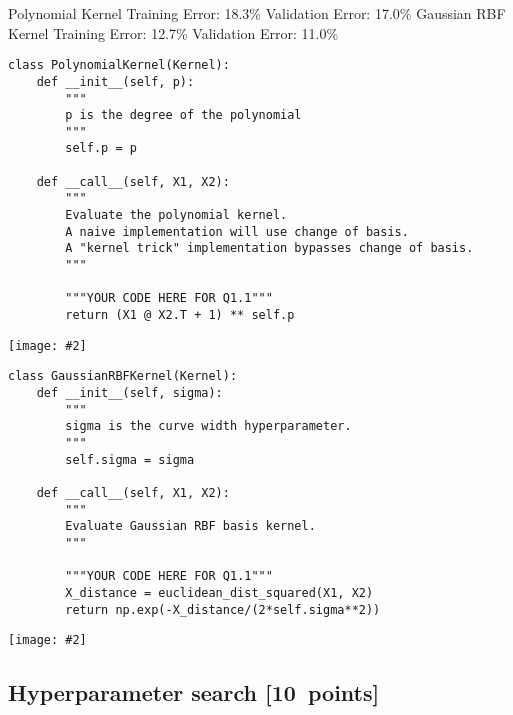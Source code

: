 \documentclass{article}
\newcommand\pts[1]{\textcolor{pointscolour}{[#1~points]}}
\newcommand{\centerfig}[2]{\begin{center}\texttt{[image: \#2]}\end{center}}
\begin{document}
\begin{ans}{\newline
Polynomial Kernel \newline
Training Error: 18.3\% \newline
Validation Error: 17.0\%
\newline \newline
Gaussian RBF Kernel \newline
Training Error: 12.7\% \newline
Validation Error: 11.0\%}
\end{ans}

\begin{verbatim}
class PolynomialKernel(Kernel):
    def __init__(self, p):
        """
        p is the degree of the polynomial
        """
        self.p = p

    def __call__(self, X1, X2):
        """
        Evaluate the polynomial kernel.
        A naive implementation will use change of basis.
        A "kernel trick" implementation bypasses change of basis.
        """

        """YOUR CODE HERE FOR Q1.1"""
        return (X1 @ X2.T + 1) ** self.p
\end{verbatim}
\centerfig{0.5}{figs/logRegPolynomial.png}

\newpage
\begin{verbatim}
class GaussianRBFKernel(Kernel):
    def __init__(self, sigma):
        """
        sigma is the curve width hyperparameter.
        """
        self.sigma = sigma

    def __call__(self, X1, X2):
        """
        Evaluate Gaussian RBF basis kernel.
        """

        """YOUR CODE HERE FOR Q1.1"""
        X_distance = euclidean_dist_squared(X1, X2)
        return np.exp(-X_distance/(2*self.sigma**2))
\end{verbatim}
\centerfig{0.5}{figs/logRegGaussianRBF.png}

\newpage
\subsection{Hyperparameter search \pts{10}}
\end{document}

